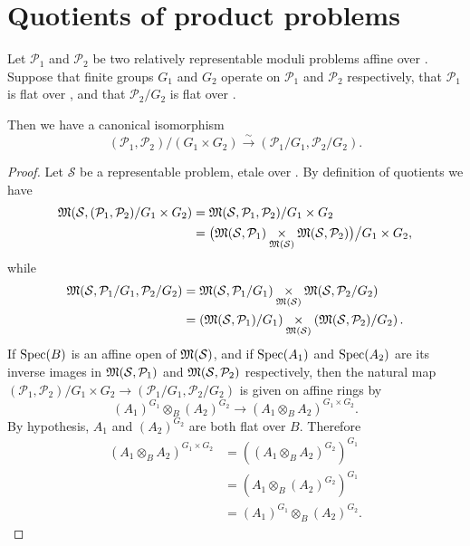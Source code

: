 \section{Quotients of product problems}
\label{sec:7.3}

\begin{kprop}\label{prop:7.3.1}
Let $\mathcal{P}_1$ and $\mathcal{P}_2$ be two relatively representable moduli problems affine over \EllR. Suppose that finite groups $G_1$ and $G_2$ operate on $\mathcal{P}_1$ and $\mathcal{P}_2$ respectively, that $\mathcal{P}_1$ is flat over \EllR, and that $\mathcal{P}_2/G_2$ is flat over \EllR.

Then we have a canonical isomorphism
\[
(\mathcal{P}_1, \mathcal{P}_2)/(G_1 \times G_2) \xrightarrow{\ \sim\ } (\mathcal{P}_1/G_1, \mathcal{P}_2/G_2) .
\]
\end{kprop}

\begin{proof}
Let $\mathcal{S}$ be a representable problem, etale over \EllR. By definition of quotients we have
\[
\begin{aligned}
\mathfrak{M}(\mathcal{S}, (\mathcal{P}_1, \mathcal{P}_2)/G_1 \times G_2) &= \mathfrak{M}(\mathcal{S}, \mathcal{P}_1, \mathcal{P}_2)/G_1 \times G_2 \\
&= \bigl( \mathfrak{M}(\mathcal{S}, \mathcal{P}_1) \underset{\mathfrak{M}(\mathcal{S})}{\times} \mathfrak{M}(\mathcal{S}, \mathcal{P}_2) \bigr) \big/ G_1 \times G_2 ,
\end{aligned}
\]
while
\[
\begin{aligned}
\mathfrak{M}(\mathcal{S}, \mathcal{P}_1/G_1, \mathcal{P}_2/G_2)
  &= \mathfrak{M}(\mathcal{S}, \mathcal{P}_1/G_1) \underset{\mathfrak{M}(\mathcal{S})}{\times} \mathfrak{M}(\mathcal{S}, \mathcal{P}_2/G_2) \\
  &= \left( \mathfrak{M}(\mathcal{S}, \mathcal{P}_1)/G_1 \right) \underset{\mathfrak{M}(\mathcal{S})}{\times} \left( \mathfrak{M}(\mathcal{S}, \mathcal{P}_2)/G_2 \right) .
\end{aligned}
\]
If $\operatorname{Spec}(B)$ is an affine open of $\mathfrak{M}(\mathcal{S})$, and if $\operatorname{Spec}(A_1)$ and $\operatorname{Spec}(A_2)$ are its inverse images in $\mathfrak{M}(\mathcal{S}, \mathcal{P}_1)$ and $\mathfrak{M}(\mathcal{S}, \mathcal{P}_2)$ respectively, then the natural map $(\mathcal{P}_1, \mathcal{P}_2)/G_1 \times G_2 \to (\mathcal{P}_1/G_1, \mathcal{P}_2/G_2)$ is given on affine rings by
\[
(A_1)^{G_1} \otimes_B (A_2)^{G_2} \to (A_1 \otimes_B A_2)^{G_1 \times G_2} .
\]
By hypothesis, $A_1$ and $(A_2)^{G_2}$ are both flat over $B$. Therefore
\[
\begin{aligned}
(A_1 \otimes_B A_2)^{G_1 \times G_2}
  &= \left( (A_1 \otimes_B A_2)^{G_2} \right)^{G_1} \\
  &= \left( A_1 \otimes_B (A_2)^{G_2} \right)^{G_1} \\
  &= (A_1)^{G_1} \otimes_B (A_2)^{G_2} .
\end{aligned}
\]
\end{proof}

